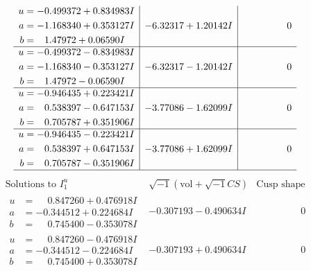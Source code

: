\documentclass[1p]{elsarticle_modified}
\theoremstyle{definition}
\newcommand{\I}{\sqrt{-1}}
\begin{document}
$$\begin{array}{c|c|c}
\begin{aligned}
u &= -0.499372 + 0.834983 I \\
a &= -1.168340 + 0.353127 I \\
b &= \phantom{-}1.47972 + 0.06590 I\end{aligned}
 & -6.32317 + 1.20142 I & \phantom{-0.000000 } 0 \\ \hline\begin{aligned}
u &= -0.499372 - 0.834983 I \\
a &= -1.168340 - 0.353127 I \\
b &= \phantom{-}1.47972 - 0.06590 I\end{aligned}
 & -6.32317 - 1.20142 I & \phantom{-0.000000 } 0 \\ \hline\begin{aligned}
u &= -0.946435 + 0.223421 I \\
a &= \phantom{-}0.538397 - 0.647153 I \\
b &= \phantom{-}0.705787 + 0.351906 I\end{aligned}
 & -3.77086 - 1.62099 I & \phantom{-0.000000 } 0 \\ \hline\begin{aligned}
u &= -0.946435 - 0.223421 I \\
a &= \phantom{-}0.538397 + 0.647153 I \\
b &= \phantom{-}0.705787 - 0.351906 I\end{aligned}
 & -3.77086 + 1.62099 I & \phantom{-0.000000 } 0\\
 \hline 
 \end{array}$$\newpage$$\begin{array}{c|c|c}  
\text{Solutions to }I^u_{1}& \I (\text{vol} + \sqrt{-1}CS) & \text{Cusp shape}\\
 \hline 
\begin{aligned}
u &= \phantom{-}0.847260 + 0.476918 I \\
a &= -0.344512 + 0.224684 I \\
b &= \phantom{-}0.745400 - 0.353078 I\end{aligned}
 & -0.307193 - 0.490634 I & \phantom{-0.000000 } 0 \\ \hline\begin{aligned}
u &= \phantom{-}0.847260 - 0.476918 I \\
a &= -0.344512 - 0.224684 I \\
b &= \phantom{-}0.745400 + 0.353078 I\end{aligned}
 & -0.307193 + 0.490634 I & \phantom{-0.000000 } 0 \\ \hline\begin{aligned}

\end{aligned}
\end{array}$$
\end{document}
